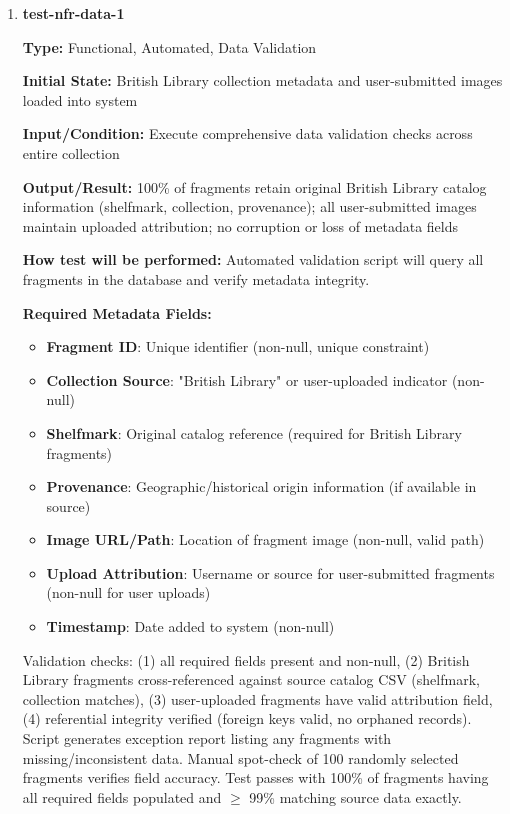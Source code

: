 \documentclass[12pt, titlepage]{article}
\begin{document}
\begin{enumerate}

\item \textbf{test-nfr-data-1}

\textbf{Type:} Functional, Automated, Data Validation
					
\textbf{Initial State:} British Library collection metadata and user-submitted images loaded into system
					
\textbf{Input/Condition:} Execute comprehensive data validation checks across entire collection
					
\textbf{Output/Result:} 100\% of fragments retain original British Library catalog information (shelfmark, collection, provenance); all user-submitted images maintain uploaded attribution; no corruption or loss of metadata fields
					
\textbf{How test will be performed:} Automated validation script will query all fragments in the database and verify metadata integrity.

\textbf{Required Metadata Fields:}
\begin{itemize}
\item \textbf{Fragment ID}: Unique identifier (non-null, unique constraint)
\item \textbf{Collection Source}: "British Library" or user-uploaded indicator (non-null)
\item \textbf{Shelfmark}: Original catalog reference (required for British Library fragments)
\item \textbf{Provenance}: Geographic/historical origin information (if available in source)
\item \textbf{Image URL/Path}: Location of fragment image (non-null, valid path)
\item \textbf{Upload Attribution}: Username or source for user-submitted fragments (non-null for user uploads)
\item \textbf{Timestamp}: Date added to system (non-null)
\end{itemize}

Validation checks: (1) all required fields present and non-null, (2) British Library fragments cross-referenced against source catalog CSV (shelfmark, collection matches), (3) user-uploaded fragments have valid attribution field, (4) referential integrity verified (foreign keys valid, no orphaned records). Script generates exception report listing any fragments with missing/inconsistent data. Manual spot-check of 100 randomly selected fragments verifies field accuracy. Test passes with 100\% of fragments having all required fields populated and $\geq$ 99\% matching source data exactly.


\end{enumerate}
\end{document}
